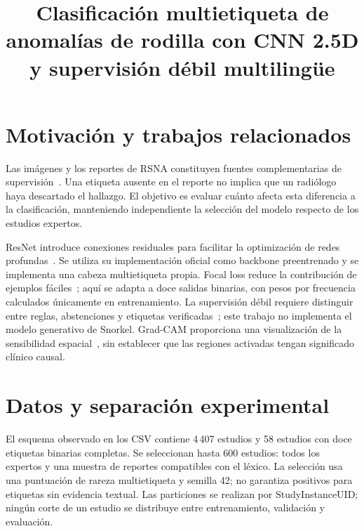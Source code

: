 
\usepackage{placeins}
\hypersetup{hidelinks}
\title{Clasificación multietiqueta de anomalías de rodilla con CNN 2.5D y supervisión débil multilingüe}

\maketitle
\begin{abstract}

\end{abstract}

\section{Motivación y trabajos relacionados}
Las imágenes y los reportes de RSNA constituyen fuentes complementarias de supervisión~\cite{rsna}.
Una etiqueta ausente en el reporte no implica que un radiólogo haya descartado el hallazgo.
El objetivo es evaluar cuánto afecta esta diferencia a la clasificación, manteniendo independiente
la selección del modelo respecto de los estudios expertos.

ResNet introduce conexiones residuales para facilitar la optimización de redes profundas~\cite{resnet}.
Se utiliza su implementación oficial como backbone preentrenado y se implementa una cabeza multietiqueta propia.
Focal loss reduce la contribución de ejemplos fáciles~\cite{focal}; aquí se adapta a doce salidas binarias,
con pesos por frecuencia calculados únicamente en entrenamiento. La supervisión débil requiere distinguir
entre reglas, abstenciones y etiquetas verificadas~\cite{snorkel}; este trabajo no implementa el modelo generativo
de Snorkel. Grad-CAM proporciona una visualización de la sensibilidad espacial~\cite{gradcam},
sin establecer que las regiones activadas tengan significado clínico causal.

\section{Datos y separación experimental}


El esquema observado en los CSV contiene 4\,407 estudios y 58 estudios con doce etiquetas binarias completas.
Se seleccionan hasta 600 estudios: todos los expertos y una muestra de reportes compatibles con el léxico.
La selección usa una puntuación de rareza multietiqueta y semilla 42; no garantiza positivos para etiquetas
sin evidencia textual. Las particiones se realizan por StudyInstanceUID; ningún corte de un estudio
se distribuye entre entrenamiento, validación y evaluación.

